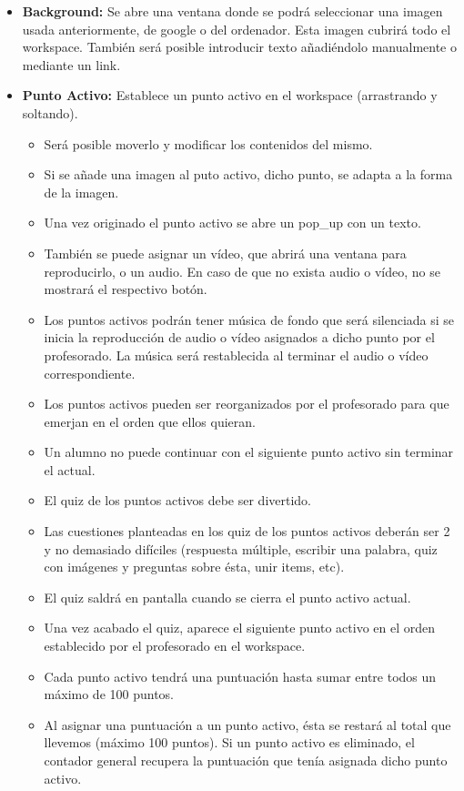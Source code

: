 \begin{itemize}
	\item \textbf{Background:} Se abre una ventana donde se podrá seleccionar una imagen usada anteriormente, de google o del ordenador. Esta imagen cubrirá todo el workspace. También será posible introducir texto añadiéndolo manualmente o mediante un link.
	\item \textbf{Punto Activo:} Establece un punto activo en el workspace (arrastrando y soltando).
	\begin{itemize}
		\item Será posible moverlo y modificar los contenidos del mismo.
		\item Si se añade una imagen al puto activo, dicho punto, se adapta a la forma de la imagen.
		\item Una vez originado el punto activo se abre un pop\_up con un texto.
		\item También se puede asignar un vídeo, que abrirá una ventana para reproducirlo, o un audio. En caso de que no exista audio o vídeo, no se mostrará el respectivo botón.
		\item Los puntos activos podrán tener música de fondo que será silenciada si se inicia la reproducción de audio o vídeo asignados a dicho punto por el profesorado. La música será restablecida al terminar el audio o vídeo correspondiente.
		\item Los puntos activos pueden ser reorganizados por el profesorado para que emerjan en el orden que ellos quieran.
		\item Un alumno no puede continuar con el siguiente punto activo sin terminar el actual.
		\item El quiz de los puntos activos debe ser divertido.
		\item Las cuestiones planteadas en los quiz de los puntos activos deberán ser 2 y no demasiado difíciles (respuesta múltiple, escribir una palabra, quiz con imágenes y preguntas sobre ésta, unir items, etc).
		\item El quiz saldrá en pantalla cuando se cierra el punto activo actual.
		\item Una vez acabado el quiz, aparece el siguiente punto activo en el orden establecido por el profesorado en el workspace.
		\item Cada punto activo tendrá una puntuación hasta sumar entre todos un máximo de 100 puntos.
		\item Al asignar una puntuación a un punto activo, ésta se restará al total que llevemos (máximo 100 puntos). Si un punto activo es eliminado, el contador general recupera la puntuación que tenía asignada dicho punto activo.

\end{itemize}
\end{itemize}
